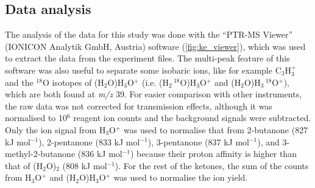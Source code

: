 \subsection{Data analysis}
The analysis of the data for this study was done with the “PTR-MS Viewer” (IONICON Analytik GmbH, Austria) software (\autoref{fig:ke_viewer}), which was used to extract the data from the experiment files. 
The multi-peak feature of this software was also useful to separate some isobaric ions, like for example C$_3$H$_3^+$ and the $^{18}$O isotopes of (H$_2$O)H$_3$O$^+$ (i.e. (H$_2\,^{18}$O)H$_3$O$^+$ and (H$_2$O)H$_3\,^{18}$O$^+$), which are both found  at \textit{m/z} 39.
For easier comparison with other instruments, the raw data was not corrected for transmission effects, although it was normalised to 10$^6$ reagent ion counts and the background signals were subtracted. 
Only the ion signal from H$_3$O$^+$ was used to normalise that from  2-butanone (827 kJ mol$^{-1}$), 2-pentanone (833 kJ mol$^{-1}$), 3-pentanone (837 kJ mol$^{-1}$), and 3-methyl-2-butanone (836 kJ mol$^{-1}$) because their proton affinity is higher than that of (H$_2$O)$_2$ (808 kJ mol$^{-1}$). 
For the rest of the ketones, the sum of the counts from H$_3$O$^+$ and (H$_2$O)H$_3$O$^+$ was used to normalise the ion yield.





